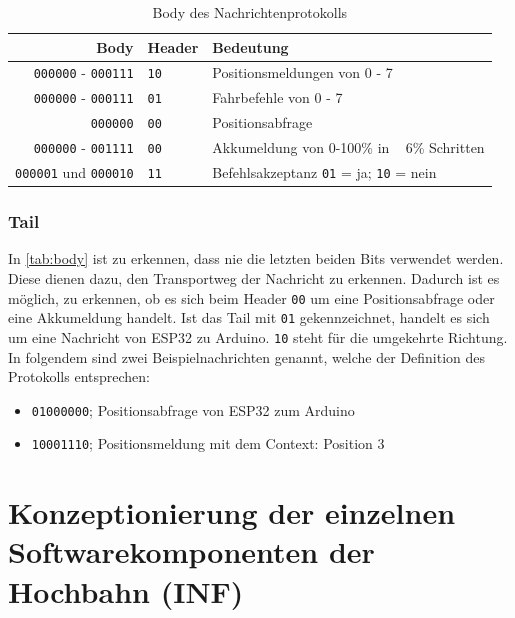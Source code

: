 \begin{table}[h]
	\begin{center}
		\begin{tabular}{r | l | l}
			Body & Header & Bedeutung \\
			\hline
			\texttt{000000} - \texttt{000111} & \texttt{10} & Positionsmeldungen von 0 - 7 \\
			\hline
			\texttt{000000} - \texttt{000111} & \texttt{01} & Fahrbefehle von 0 - 7 \\
			\hline
			\texttt{000000} & \texttt{00} & Positionsabfrage \\
			\hline
			\texttt{000000} - \texttt{001111} & \texttt{00} & Akkumeldung von 0-100\% in ~ 6\% Schritten \\
			\hline
			\texttt{000001} und \texttt{000010} & \texttt{11} & Befehlsakzeptanz \texttt{01} = ja; \texttt{10} = nein\\  
		\end{tabular}
	\end{center}
	\caption{\label{tab:body}Body des Nachrichtenprotokolls}
\end{table}

\subsection{Tail}
In \autoref{tab:body} ist zu erkennen, dass nie die letzten beiden Bits verwendet werden. Diese dienen dazu, den Transportweg der Nachricht zu erkennen. Dadurch ist es möglich, zu erkennen, ob es sich beim Header \texttt{00} um eine Positionsabfrage oder eine Akkumeldung handelt.
Ist das Tail mit \texttt{01} gekennzeichnet, handelt es sich um eine Nachricht von ESP32 zu Arduino. \texttt{10} steht für die umgekehrte Richtung.
In folgendem sind zwei Beispielnachrichten genannt, welche der Definition des Protokolls entsprechen:

\begin{center}
	\begin{itemize}
		\item \texttt{01000000}; Positionsabfrage von ESP32 zum Arduino
		\item \texttt{10001110}; Positionsmeldung mit dem Context: Position 3  
	\end{itemize}
\end{center}
\newpage


\chapter{Konzeptionierung der einzelnen Softwarekomponenten der Hochbahn (INF)}
